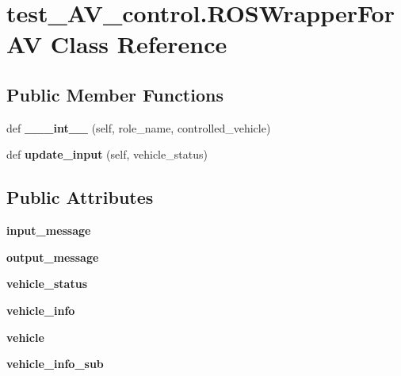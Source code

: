 \hypertarget{classtest__AV__control_1_1ROSWrapperForAV}{}\section{test\+\_\+\+A\+V\+\_\+control.\+R\+O\+S\+Wrapper\+For\+AV Class Reference}
\label{classtest__AV__control_1_1ROSWrapperForAV}
\subsection*{Public Member Functions}
\begin{DoxyCompactItemize}
\item 
\mbox{\label{classtest__AV__control_1_1ROSWrapperForAV_a66b853bf8b64afe0d44a265215bc8ae0}} 
def {\bfseries \+\_\+\+\_\+\+\_\+int\+\_\+\+\_\+} (self, role\+\_\+name, controlled\+\_\+vehicle)
\item 
\mbox{\label{classtest__AV__control_1_1ROSWrapperForAV_a6a64b8beae34b34a0d02ef34c136b1b8}} 
def {\bfseries update\+\_\+input} (self, vehicle\+\_\+status)
\end{DoxyCompactItemize}
\subsection*{Public Attributes}
\begin{DoxyCompactItemize}
\item 
\mbox{\label{classtest__AV__control_1_1ROSWrapperForAV_aa9c3154d75ae8989e14888cd34070070}} 
{\bfseries input\+\_\+message}
\item 
\mbox{\label{classtest__AV__control_1_1ROSWrapperForAV_aa747f1e5ee4e23273c8fa238c40977f3}} 
{\bfseries output\+\_\+message}
\item 
\mbox{\label{classtest__AV__control_1_1ROSWrapperForAV_adc901e886f31d04a4219045a9fdd8aed}} 
{\bfseries vehicle\+\_\+status}
\item 
\mbox{\label{classtest__AV__control_1_1ROSWrapperForAV_a83c065c65b545baf8c38c5c7b84bb84c}} 
{\bfseries vehicle\+\_\+info}
\item 
\mbox{\label{classtest__AV__control_1_1ROSWrapperForAV_aebb6cc1fc535c0007ca6836026b67fe5}} 
{\bfseries vehicle}
\item 
\mbox{\label{classtest__AV__control_1_1ROSWrapperForAV_adeffe4ed2ea330451919b4e17d11b7b7}} 
{\bfseries vehicle\+\_\+info\+\_\+sub}
\end{DoxyCompactItemize}


